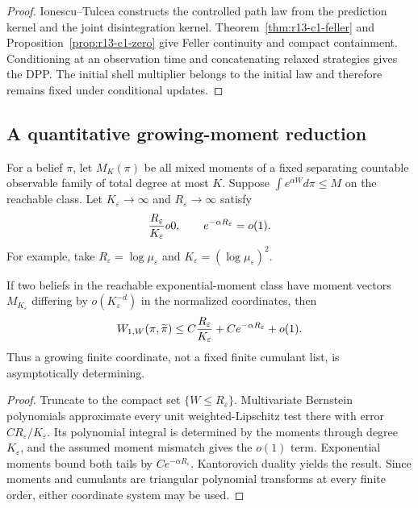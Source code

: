 \begin{proof}
Ionescu--Tulcea constructs the controlled path law from the prediction kernel
and the joint disintegration kernel.  Theorem~\ref{thm:r13-c1-feller} and
Proposition~\ref{prop:r13-c1-zero} give Feller continuity and compact
containment.  Conditioning at an observation time and concatenating relaxed
strategies gives the DPP.  The initial shell multiplier belongs to the initial
law and therefore remains fixed under conditional updates.
\end{proof}

\subsection{A quantitative growing-moment reduction}

For a belief $\pi$, let $M_K(\pi)$ be all mixed moments of a fixed separating
countable observable family of total degree at most $K$.  Suppose
$\int e^{\alpha W}d\pi\le M$ on the reachable class.  Let
$K_\varepsilon\to\infty$ and $R_\varepsilon\to\infty$ satisfy
\[
 {R_\varepsilon\over K_\varepsilon}	o0,
 \qquad e^{-\alpha R_\varepsilon}=o(1).
\]
For example, take
$R_\varepsilon=\log\mu_\varepsilon$ and
$K_\varepsilon=(\log\mu_\varepsilon)^2$.

\begin{lemma}
\label{lem:r13-c1-moments}
If two beliefs in the reachable exponential-moment class have moment vectors
$M_{K_\varepsilon}$ differing by $o(K_\varepsilon^{-d})$ in the normalized
coordinates, then
\[
 W_{1,W}(\pi,\widetilde\pi)
 \le C{R_\varepsilon\over K_\varepsilon}
    +Ce^{-\alpha R_\varepsilon}+o(1).
\]
Thus a growing finite coordinate, not a fixed finite cumulant list, is
asymptotically determining.
\end{lemma}

\begin{proof}
Truncate to the compact set $\{W\le R_\varepsilon\}$.  Multivariate Bernstein
polynomials approximate every unit weighted-Lipschitz test there with error
$CR_\varepsilon/K_\varepsilon$.  Its polynomial integral is determined by the
moments through degree $K_\varepsilon$, and the assumed moment mismatch gives
the $o(1)$ term.  Exponential moments bound both tails by
$Ce^{-\alpha R_\varepsilon}$.  Kantorovich duality yields the result.  Since
moments and cumulants are triangular polynomial transforms at every finite
order, either coordinate system may be used.
\end{proof}

